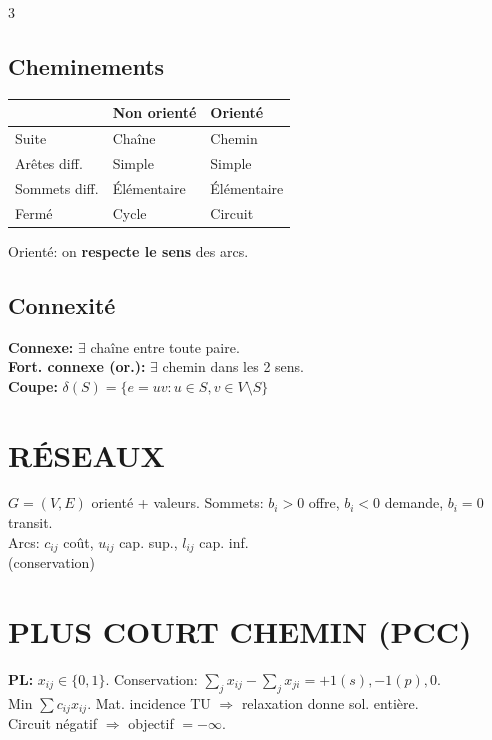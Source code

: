 \documentclass[a4paper,4pt]{article}
\begin{document}
\begin{multicols}{3}
\subsection{Cheminements}
\begin{tabular}{@{}l|l|l@{}}
& Non orient\'e & Orient\'e\\
\hline
Suite & Cha\^ine & Chemin\\
Ar\^etes diff. & Simple & Simple\\
Sommets diff. & \'El\'ementaire & \'El\'ementaire\\
Ferm\'e & Cycle & Circuit
\end{tabular}
Orient\'e: on \textbf{respecte le sens} des arcs.

\subsection{Connexit\'e}
\textbf{Connexe:} $\exists$ cha\^ine entre toute paire.\\
\textbf{Fort. connexe (or.):} $\exists$ chemin dans les 2 sens.\\
\textbf{Coupe:} $\delta(S)=\{e=uv: u\in S, v\in V\setminus S\}$

\section{R\'ESEAUX}

$G=(V,E)$ orient\'e + valeurs. Sommets: $b_i>0$ offre, $b_i<0$ demande, $b_i=0$ transit.\\
Arcs: $c_{ij}$ co\^ut, $u_{ij}$ cap. sup., $l_{ij}$ cap. inf.\\
{\color{red}} (conservation)

\section{PLUS COURT CHEMIN (PCC)}

\textbf{PL:} $x_{ij}\in\{0,1\}$. Conservation: $\sum_j x_{ij}-\sum_j x_{ji}=+1(s),-1(p),0$.\\
Min $\sum c_{ij}x_{ij}$. Mat. incidence TU $\Rightarrow$ relaxation donne sol. enti\`ere.\\
Circuit n\'egatif $\Rightarrow$ objectif $=-\infty$.


\end{multicols}
\end{document}
